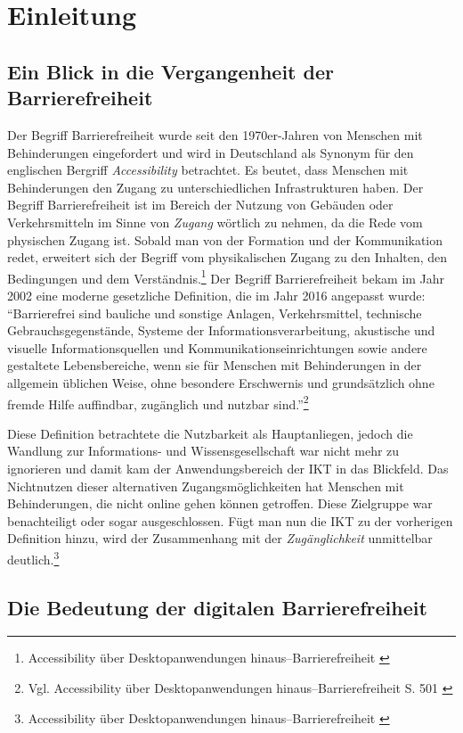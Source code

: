 \section{Einleitung}

\subsection{Ein Blick in die Vergangenheit der Barrierefreiheit}
Der Begriff Barrierefreiheit wurde seit den 1970er-Jahren von Menschen mit Behinderungen eingefordert und wird in Deutschland als Synonym für den englischen Bergriff \textit{Accessibility} betrachtet. Es beutet, dass Menschen mit Behinderungen den Zugang zu unterschiedlichen Infrastrukturen haben. Der Begriff Barrierefreiheit ist im Bereich der Nutzung von Gebäuden oder Verkehrsmitteln im Sinne von \textit{Zugang} wörtlich zu nehmen, da die Rede vom physischen Zugang ist. Sobald man von der Formation und der Kommunikation redet, erweitert sich der Begriff vom physikalischen Zugang zu den Inhalten, den Bedingungen und dem Verständnis.\footnote{Accessibility über Desktopanwendungen hinaus–Barrierefreiheit \cite{buhler2017accessibility}} Der Begriff Barrierefreiheit bekam im Jahr 2002 eine moderne gesetzliche Definition, die im Jahr 2016 angepasst wurde: "`Barrierefrei sind bauliche und sonstige Anlagen, Verkehrsmittel, technische Gebrauchsgegenstände, Systeme der Informationsverarbeitung, akustische und visuelle Informationsquellen und Kommunikationseinrichtungen sowie andere gestaltete Lebensbereiche, wenn sie für Menschen mit Behinderungen in der allgemein üblichen Weise, ohne besondere Erschwernis und grundsätzlich ohne fremde Hilfe auffindbar, zugänglich und nutzbar sind."'\footnote{Vgl. Accessibility über Desktopanwendungen hinaus–Barrierefreiheit S. 501 \cite{buhler2017accessibility}}

Diese Definition betrachtete die Nutzbarkeit als Hauptanliegen, jedoch die Wandlung zur Informations- und Wissensgesellschaft war nicht mehr zu ignorieren und damit kam der Anwendungsbereich der \ac{IKT} in das Blickfeld. Das Nichtnutzen dieser alternativen Zugangsmöglichkeiten hat Menschen mit Behinderungen, die nicht online gehen können getroffen. Diese Zielgruppe war benachteiligt oder sogar ausgeschlossen. Fügt man nun die \ac{IKT} zu der vorherigen Definition hinzu, wird der Zusammenhang mit der \textit{Zugänglichkeit} unmittelbar deutlich.\footnote{Accessibility über Desktopanwendungen hinaus–Barrierefreiheit \cite{buhler2017accessibility}}

\subsection{Die Bedeutung der digitalen Barrierefreiheit}

